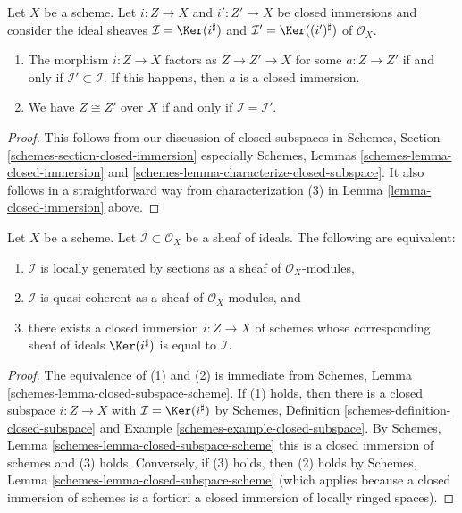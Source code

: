 \begin{lemma}
\label{lemma-closed-immersion-ideals}
Let $X$ be a scheme. Let $i : Z \to X$ and $i' : Z' \to X$
be closed immersions and consider the ideal sheaves
$\mathcal{I} = \Ker(i^\sharp)$ and $\mathcal{I}' = \Ker((i')^\sharp)$
of $\mathcal{O}_X$.
\begin{enumerate}
\item The morphism $i : Z \to X$ factors as $Z \to Z' \to X$
for some $a : Z \to Z'$ if and only if $\mathcal{I}' \subset \mathcal{I}$.
If this happens, then $a$ is a closed immersion.
\item We have $Z \cong Z'$ over $X$ if and only if
$\mathcal{I} = \mathcal{I}'$.
\end{enumerate}
\end{lemma}

\begin{proof}
This follows from our discussion of closed subspaces in
Schemes, Section \ref{schemes-section-closed-immersion} especially
Schemes, Lemmas
\ref{schemes-lemma-closed-immersion} and
\ref{schemes-lemma-characterize-closed-subspace}.
It also follows in a straightforward way from characterization
(3) in Lemma \ref{lemma-closed-immersion} above.
\end{proof}

\begin{lemma}
\label{lemma-closed-immersion-bijection-ideals}
Let $X$ be a scheme.
Let $\mathcal{I} \subset \mathcal{O}_X$ be a sheaf of ideals.
The following are equivalent:
\begin{enumerate}
\item $\mathcal{I}$ is locally generated by
sections as a sheaf of $\mathcal{O}_X$-modules,
\item $\mathcal{I}$ is quasi-coherent as
a sheaf of $\mathcal{O}_X$-modules, and
\item there exists a closed immersion $i : Z \to X$ of schemes whose
corresponding sheaf of ideals $\Ker(i^\sharp)$ is equal to $\mathcal{I}$.
\end{enumerate}
\end{lemma}

\begin{proof}
The equivalence of (1) and (2) is immediate from
Schemes, Lemma \ref{schemes-lemma-closed-subspace-scheme}.
If (1) holds, then there is a closed subspace $i : Z \to X$
with $\mathcal{I} = \Ker(i^\sharp)$ by
Schemes, Definition \ref{schemes-definition-closed-subspace}
and Example \ref{schemes-example-closed-subspace}.
By Schemes, Lemma \ref{schemes-lemma-closed-subspace-scheme}
this is a closed immersion of schemes and (3) holds.
Conversely, if (3) holds, then (2) holds by
Schemes, Lemma \ref{schemes-lemma-closed-subspace-scheme}
(which applies because a closed immersion of schemes is a fortiori a
closed immersion of locally ringed spaces).
\end{proof}

